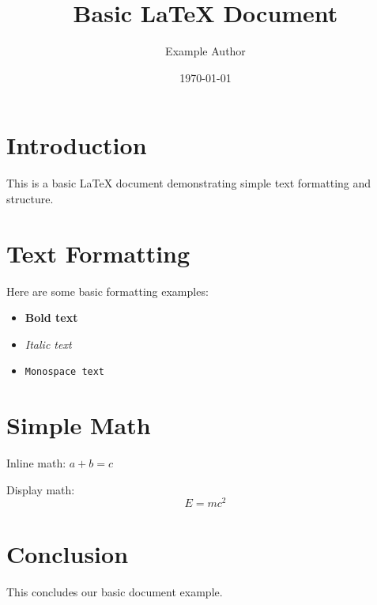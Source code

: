 \documentclass{article}
\title{Basic LaTeX Document}
\author{Example Author}
\date{\today}
\begin{document}
\maketitle

\section{Introduction}

This is a basic LaTeX document demonstrating simple text formatting and structure.

\section{Text Formatting}

Here are some basic formatting examples:
\begin{itemize}
\item \textbf{Bold text}
\item \textit{Italic text}
\item \texttt{Monospace text}
\end{itemize}

\section{Simple Math}

Inline math: $a + b = c$

Display math:
$$E = mc^2$$

\section{Conclusion}

This concludes our basic document example.
\end{document}
